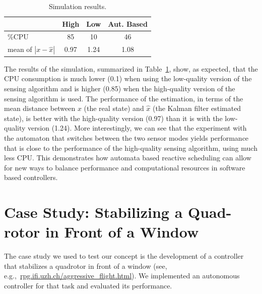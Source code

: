 \documentclass[ twoside, 12pt ]{article}
\begin{document}
\begin{table}
    \centering
    \begin{tabular}{ |  l  | c | c | c | }
        \hline
        &  High & Low & Aut. Based \\ \hline \hline
        \%CPU                    & 85 & 10  & 46 \\ \hline
        mean of $|x -\hat{x}|$ & 0.97 & 1.24 & 1.08 \\ \hline
    \end{tabular}
    \caption{Simulation results.}
    \label{tbl:sim-results}
\end{table}

The results of the simulation, summarized in Table~\ref{tbl:sim-results}, show, as expected, that the CPU consumption is much lower (0.1) when using the low-quality version of the sensing algorithm and is higher (0.85) when the high-quality version of the sensing algorithm is used. The performance of the estimation, in terms of the mean distance between $x$ (the real state) and $\hat x$ (the Kalman filter estimated state), is better with the high-quality version (0.97) than it is with the low-quality version (1.24). More interestingly, we can see that the experiment with the automaton that switches between the two sensor modes yields performance that is close to the performance of the high-quality sensing algorithm, using much less CPU. This demonstrates how automata based reactive scheduling can allow for new ways to balance performance and computational resources in software based controllers. 

\section{Case Study: Stabilizing a Quad-rotor in Front of a Window}
\label{sec:caseStudy}

The case study we used to test our concept is the development of a controller that stabilizes a quadrotor in front of a window (see, e.g.,~\url{rpg.ifi.uzh.ch/aggressive_flight.html}).
We implemented an autonomous controller for that task and evaluated its performance.
\end{document}
